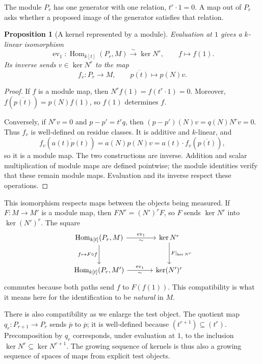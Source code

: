 \documentclass[11pt]{article}
\newtheorem{proposition}[theorem]{Proposition}
\theoremstyle{definition}
\theoremstyle{remark}\newtheorem{remark}[theorem]{Remark}
\newcommand{\iso}{\xrightarrow{\sim}}
\DeclareMathOperator{\Ker}{ker}
\DeclareMathOperator{\Hom}{Hom}
\begin{document}
The module $P_r$ has one generator with one relation, $t^r\cdot1=0$.
A map out of $P_r$ asks whether a proposed image of the generator satisfies
that relation.

\begin{proposition}[A kernel represented by a module]
\label{p:hom-kernel}
Evaluation at $1$ gives a $k$-linear isomorphism
\[
 \operatorname{ev}_1:\Hom_{k[t]}(P_r,M)\iso\Ker N^r,
 \qquad f\longmapsto f(1).
\]
Its inverse sends $v\in\Ker N^r$ to the map
\[
 f_v:P_r\longrightarrow M,\qquad \overline{p(t)}\longmapsto p(N)v.
\]
\end{proposition}

\begin{proof}
If $f$ is a module map, then
$N^rf(1)=f(t^r\cdot1)=0$. Moreover,
$f(\overline{p(t)})=p(N)f(1)$, so $f(1)$ determines $f$.

Conversely, if $N^rv=0$ and $p-p'=t^rq$, then
$(p-p')(N)v=q(N)N^rv=0$. Thus $f_v$ is well-defined on residue classes.
It is additive and $k$-linear, and
\[
 f_v(\overline{a(t)p(t)})=a(N)p(N)v
 =a(t)\cdot f_v(\overline{p(t)}),
\]
so it is a module map. The two constructions are inverse. Addition and
scalar multiplication of module maps are defined pointwise; the module
identities verify that these remain module maps. Evaluation and its inverse
respect these operations.
\end{proof}

This isomorphism respects maps between the objects being measured. If
$F:M\to M'$ is a module map, then $FN^r=(N')^rF$, so $F$ sends
$\Ker N^r$ into $\Ker(N')^r$. The square
\[
\begin{tikzcd}[column sep=large,row sep=large]
\Hom_{k[t]}(P_r,M) \arrow[r,"\operatorname{ev}_1","\sim"']
  \arrow[d,"f\mapsto F\circ f"']
  & \Ker N^r \arrow[d,"F|_{\Ker N^r}"] \\
\Hom_{k[t]}(P_r,M') \arrow[r,"\operatorname{ev}_1","\sim"']
  & \Ker (N')^r
\end{tikzcd}
\]
commutes because both paths send $f$ to $F(f(1))$. This compatibility is what
it means here for the identification to be \emph{natural} in $M$.

There is also compatibility as we enlarge the test object. The quotient
map $q_r:P_{r+1}\to P_r$ sends $\overline p$ to $\overline p$; it is
well-defined because $(t^{r+1})\subseteq(t^r)$. Precomposition by $q_r$
corresponds, under evaluation at $1$, to the inclusion
$\Ker N^r\subseteq\Ker N^{r+1}$. The growing sequence of kernels is thus
also a growing sequence of spaces of maps from explicit test objects.
\end{document}
